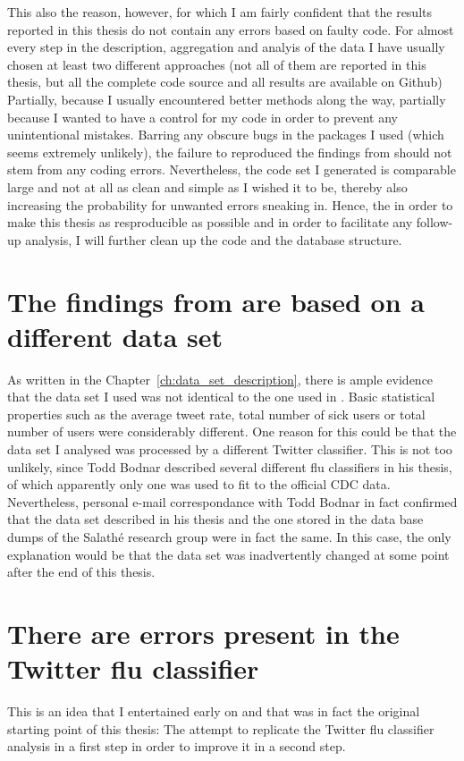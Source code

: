 \documentclass[11pt, a4paper]{report}\usepackage[]{graphicx}\usepackage[]{color}
\begin{document}
This also the reason, however, for which I am fairly confident that the results reported in this thesis do not contain any errors based on faulty code. For almost every step in the description, aggregation and analyis of the data I have usually chosen at least two different approaches (not all of them are reported in this thesis, but all the complete code source and all results are available on Github) Partially, because I usually encountered better methods along the way, partially because I wanted to have a control for my code in order to prevent any unintentional mistakes. Barring any obscure bugs in the packages I used (which seems extremely unlikely), the failure to reproduced the findings from \citep{bodnar_data_2015} should not stem from any coding errors. Nevertheless, the code set I generated is comparable large and not at all as clean and simple as I wished it to be, thereby also increasing the probability for unwanted errors sneaking in. Hence, the in order to make this thesis as resproducible as possible and in order to facilitate any follow-up analysis, I will further clean up the code and the database structure.\newline

\section{The findings from \citep{bodnar_data_2015} are based on a different data set}
As written in the Chapter~\ref{ch:data_set_description}, there is ample evidence that the data set I used was not identical to the one used in \citep{bodnar_data_2015}. Basic statistical properties such as the average tweet rate, total number of sick users or total number of users were considerably different. One reason for this could be that the data set I analysed was processed by a different Twitter classifier. This is not too unlikely, since Todd Bodnar described several different flu classifiers in his thesis, of which apparently only one was used to fit to the official CDC data. Nevertheless, personal e-mail correspondance with Todd Bodnar in fact confirmed that the data set described in his thesis and the one stored in the data base dumps of the Salathé research group were in fact the same. In this case, the only explanation would be that the data set was inadvertently changed at some point after the end of this thesis.\newline

\section{There are errors present in the Twitter flu classifier}
This is an idea that I entertained early on and that was in fact the original starting point of this thesis: The attempt to replicate the Twitter flu classifier analysis in a first step in order to improve it in a second step.\newline
\end{document}
